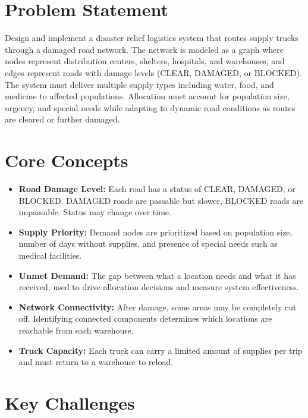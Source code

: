 \section{Problem Statement}

Design and implement a disaster relief logistics system that routes supply trucks through a damaged road network. The network is modeled as a graph where nodes represent distribution centers, shelters, hospitals, and warehouses, and edges represent roads with damage levels (CLEAR, DAMAGED, or BLOCKED). The system must deliver multiple supply types including water, food, and medicine to affected populations. Allocation must account for population size, urgency, and special needs while adapting to dynamic road conditions as routes are cleared or further damaged.

\section{Core Concepts}

\begin{itemize}
  \item \textbf{Road Damage Level:} Each road has a status of CLEAR, DAMAGED, or BLOCKED. DAMAGED roads are passable but slower, BLOCKED roads are impassable. Status may change over time.
  \item \textbf{Supply Priority:} Demand nodes are prioritized based on population size, number of days without supplies, and presence of special needs such as medical facilities.
  \item \textbf{Unmet Demand:} The gap between what a location needs and what it has received, used to drive allocation decisions and measure system effectiveness.
  \item \textbf{Network Connectivity:} After damage, some areas may be completely cut off. Identifying connected components determines which locations are reachable from each warehouse.
  \item \textbf{Truck Capacity:} Each truck can carry a limited amount of supplies per trip and must return to a warehouse to reload.
\end{itemize}

\section{Key Challenges}


